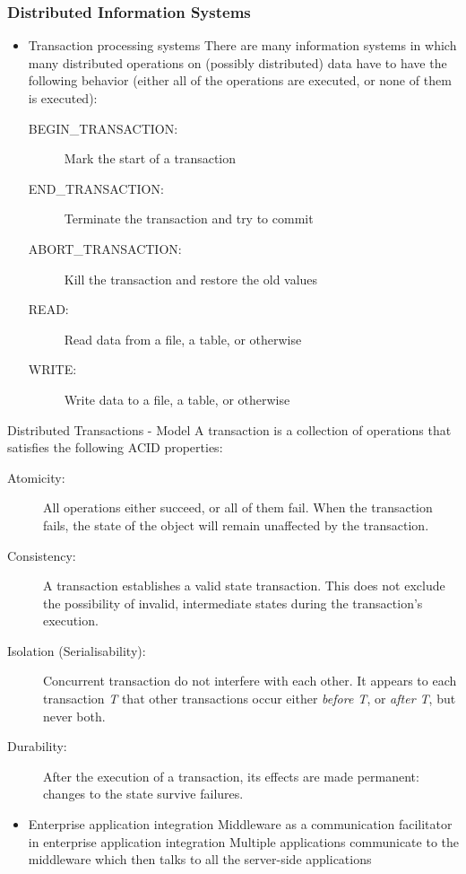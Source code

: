 \subsubsection{Distributed Information Systems}
\begin{itemize}
	\item Transaction processing systems
	\subitem There are many information systems in which many distributed operations on (possibly distributed) data have to have the following behavior (either all of the operations are executed, or none of them is executed):
	\begin{description}
		\item[BEGIN\_TRANSACTION:] Mark the start of a transaction
		\item[END\_TRANSACTION:] Terminate the transaction and try to commit
		\item[ABORT\_TRANSACTION:] Kill the transaction and restore the old values
		\item[READ:] Read data from a file, a table, or otherwise
		\item[WRITE:] Write data to a file, a table, or otherwise
	\end{description}
\end{itemize}
\begin{note}{Distributed Transactions - Model}
	A transaction is a collection of operations that satisfies the following ACID properties:
	\begin{description}
		\item[Atomicity:] All operations either succeed, or all of them fail. When the transaction fails, the state of the object will remain unaffected by the transaction.
		\item[Consistency:] A transaction establishes a valid state transaction. This does not exclude the possibility of invalid, intermediate states during the transaction's execution.
		\item[Isolation (Serialisability):] Concurrent transaction do not interfere with each other. It appears to each transaction \textit{T} that other transactions occur either \textit{before T}, or \textit{after T}, but never both.
		\item[Durability:] After the execution of a transaction, its effects are made permanent: changes to the state survive failures.
	\end{description}
\end{note}
\begin{itemize}
	\item Enterprise application integration
	\subitem Middleware as a communication facilitator in enterprise application integration
	\subitem Multiple applications communicate to the middleware which then talks to all the server-side applications
\end{itemize}
